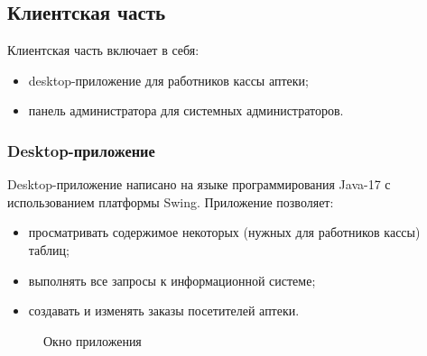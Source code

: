 \documentclass[a4paper]{article}
\begin{document}
		\subsection{Клиентская часть}
			Клиентская часть включает в себя:
			\begin{itemize}
				\item desktop-приложение для работников кассы аптеки;
				
				\item панель администратора для системных администраторов.
			\end{itemize}

			\subsubsection{Desktop-приложение}
				Desktop-приложение написано на языке программирования Java-17 с использованием платформы Swing. Приложение позволяет:
				\begin{itemize}
					\item просматривать содержимое некоторых (нужных для работников кассы) таблиц;
					
					\item выполнять все запросы к информационной системе;
					
					\item создавать и изменять заказы посетителей аптеки.
				\end{itemize}
					
				\begin{figure}[H]
					\centering
					\caption{Окно приложения}
				\end{figure}
				
\end{document}
